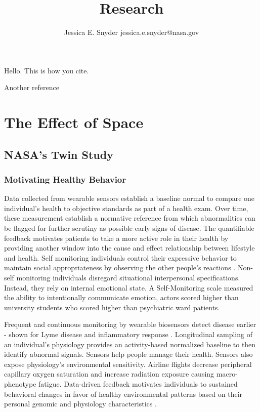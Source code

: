 \documentclass[a4paper, 11pt]{article}
\begin{document}
\author{Jessica E. Snyder jessica.e.snyder@nasa.gov}
\title{ Research}
\maketitle

\tableofcontents


   
   Hello. This is how you cite. \cite{gustafsson2016best}
   
   Another reference \cite{hamid2015surface}
   
    \section{The Effect of Space}
    \subsection{NASA's Twin Study}
    
    \subsubsection{Motivating Healthy Behavior}
    Data collected from wearable sensors establish a baseline normal to compare one individual's health to objective standards as part of a health exam. Over time, these measurement establish a normative reference from which abnormalities can be flagged for further scrutiny as possible early signs of disease. The quantifiable feedback motivates patients to take a more active role in their health by providing another window into the cause and effect relationship between lifestyle and health. 
    Self monitoring individuals control their expressive behavior to maintain social appropriateness by observing the other people's reactions  \cite{snyder1974self}. Non-self monitoring individuals disregard situational interpersonal specifications. Instead, they rely on internal emotional state. A Self-Monitoring scale measured the ability to intentionally communicate emotion, actors scored higher than university students who scored higher than psychiatric ward patients.
    
    Frequent and continuous monitoring by wearable biosensors detect disease earlier - shown for Lyme disease and inflammatory response \cite{li2017digital}. Longitudinal sampling of an individual's physiology provides an activity-based normalized baseline to then identify abnormal signals. Sensors help people manage their health. Sensors also expose physiology's environmental sensitivity.  Airline flights decrease peripheral capillary oxygen saturation and increase radiation exposure causing macro-phenotype fatigue. 
    Data-driven feedback motivates individuals to sustained behavioral changes in favor of healthy environmental patterns based on their personal genomic and physiology characteristics \cite{kellogg2018personal}. 
    
\end{document}
